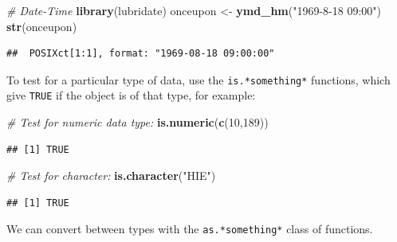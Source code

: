 \documentclass[]{book}
\newenvironment{Shaded}{\begin{snugshade}}{\end{snugshade}}
\newcommand{\CommentTok}[1]{\textcolor[rgb]{0.56,0.35,0.01}{\textit{#1}}}
\newcommand{\DecValTok}[1]{\textcolor[rgb]{0.00,0.00,0.81}{#1}}
\newcommand{\KeywordTok}[1]{\textcolor[rgb]{0.13,0.29,0.53}{\textbf{#1}}}
\newcommand{\NormalTok}[1]{#1}
\newcommand{\StringTok}[1]{\textcolor[rgb]{0.31,0.60,0.02}{#1}}
\begin{document}
\begin{Shaded}
\begin{Highlighting}[]
\CommentTok{# Date-Time}
\KeywordTok{library}\NormalTok{(lubridate)}
\NormalTok{onceupon <-}\StringTok{ }\KeywordTok{ymd_hm}\NormalTok{(}\StringTok{"1969-8-18 09:00"}\NormalTok{)}
\KeywordTok{str}\NormalTok{(onceupon)}
\end{Highlighting}
\end{Shaded}

\begin{verbatim}
##  POSIXct[1:1], format: "1969-08-18 09:00:00"
\end{verbatim}

To test for a particular type of data, use the \texttt{is.*something*} functions,
which give \texttt{TRUE} if the object is of that type, for example:

\begin{Shaded}
\begin{Highlighting}[]
\CommentTok{# Test for numeric data type:}
\KeywordTok{is.numeric}\NormalTok{(}\KeywordTok{c}\NormalTok{(}\DecValTok{10}\NormalTok{,}\DecValTok{189}\NormalTok{))}
\end{Highlighting}
\end{Shaded}

\begin{verbatim}
## [1] TRUE
\end{verbatim}

\begin{Shaded}
\begin{Highlighting}[]
\CommentTok{# Test for character:}
\KeywordTok{is.character}\NormalTok{(}\StringTok{"HIE"}\NormalTok{)}
\end{Highlighting}
\end{Shaded}

\begin{verbatim}
## [1] TRUE
\end{verbatim}

We can convert between types with the \texttt{as.*something*} class of functions.
\end{document}
